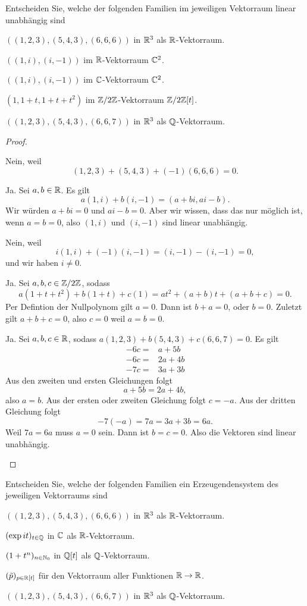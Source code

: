 \begin{Problem}
	Entscheiden Sie, welche der folgenden Familien im jeweiligen Vektorraum linear unabhängig sind
	\begin{parts}
	\item $((1, 2, 3), (5, 4, 3), (6, 6, 6))$ in $\mathbb{R}^3$ als $\mathbb{R}$-Vektorraum.
	\item $((1, i), (i, -1))$ im $\mathbb{R}$-Vektorraum $\mathbb{C}^2$.
	\item $((1, i), (i, -1))$ im $\mathbb{C}$-Vektorraum $\mathbb{C}^2$.
	\item $(1,1+t,1+t+t^2)$ im $\mathbb{Z} / 2\mathbb{Z}$-Vektorraum $\mathbb{Z} / 2\mathbb{Z}[t]$.
	\item $((1, 2, 3), (5, 4, 3), (6, 6, 7))$ in $\mathbb{R}^3$ als $\mathbb{Q}$-Vektorraum.
	\end{parts}
\end{Problem}
\begin{proof}
	\begin{parts}
	\item Nein, weil
		\[
			(1,2,3)+(5,4,3)+(-1)(6,6,6)=0
		.\] 
	\item Ja. Sei $a,b\in \mathbb{R}$. Es gilt
		\[
		a(1,i)+b(i,-1)=(a+bi,ai-b)
	.\]
	Wir würden $a+bi=0$ und $ai-b=0$. Aber wir wissen, dass das nur möglich ist, wenn $a=b=0$, also $(1,i)$ und $(i,-1)$ sind linear unabhängig.
\item Nein, weil
	\[
	i(1,i)+(-1)(i,-1)=(i,-1)-(i,-1)=0
	,\]
	und wir haben $i\neq 0$.
\item Ja. Sei $a,b,c\in \mathbb{Z} / 2\mathbb{Z}$, sodass
	\[
	a(1+t+t^2)+b(1+t)+c(1)=at^2+(a+b)t+(a+b+c)=0
	.\] 
	Per Defintion der Nullpolynom gilt $a=0$. Dann ist $b+a=0$, oder $b=0$. Zuletzt gilt $a+b+c=0$, also $c=0$ weil $a=b=0$.
\item  Ja. Sei $a,b,c\in \mathbb{R}$, sodass $a(1,2,3)+b(5,4,3)+c(6,6,7)=0$. Es gilt
\begin{align*}
	-6c=&a+5b\\
	-6c=&2a+4b\\
	-7c=&3a+3b
\end{align*}
Aus den zweiten und ersten Gleichungen folgt
\[
a+5b=2a+4b
,\]
also $a=b$. Aus der ersten oder zweiten Gleichung folgt $c=-a$. Aus der dritten Gleichung folgt
\[
-7(-a)=7a=3a+3b=6a
.\]
Weil $7a=6a$ muss $a=0$ sein. Dann ist $b=c=0$. Also die Vektoren sind linear unabhängig.
	\end{parts} 
\end{proof}
\begin{Problem}
	Entscheiden Sie, welche der folgenden Familien ein Erzeugendensystem des jeweiligen Vektorraums sind
	\begin{parts}
	\item $((1, 2, 3), (5, 4, 3), (6, 6, 6))$ in $\mathbb{R}^3$ als  $\mathbb{R}$-Vektorraum.
	\item $(\exp it)_{t\in \mathbb{Q}}$ in $\mathbb{C}$ als $\mathbb{R}$-Vektorraum.
	\item $(1+t^n)_{n\in \mathbb{N}_0}$ in $\mathbb{Q}[t]$ als $\mathbb{Q}$-Vektorraum. 
	\item $(\tilde{p})_{p\in \mathbb{R}[t]}$ f\"{u}r den Vektorraum aller Funktionen $\mathbb{R}\to \mathbb{R}$.
	\item $((1, 2, 3), (5, 4, 3), (6, 6, 7))$ in $\mathbb{R}^3$ als $\mathbb{Q}$-Vektorraum. 
	\end{parts}
\end{Problem}
